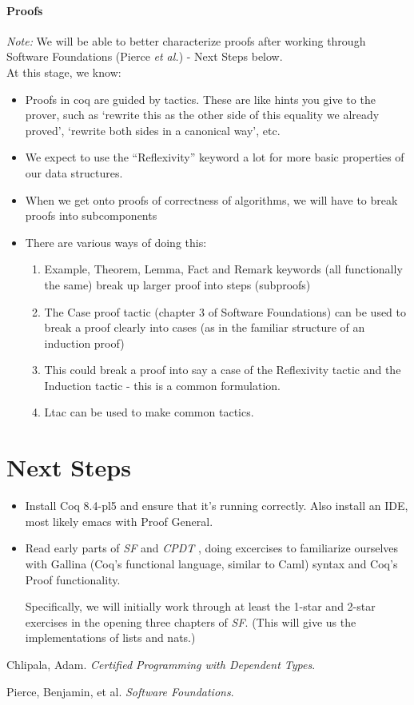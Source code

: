 \documentclass{article}
\begin{document}
\paragraph{Proofs}  %
\emph{Note:} We will be able to better characterize proofs after
working through Software Foundations (Pierce \emph{et al.}) - Next
Steps below.\\
At this stage, we know:
\begin{itemize}
\item Proofs in coq are guided by tactics. These are like hints you
  give to the prover, such as ‘rewrite this as the other side of this
  equality we already proved’, ‘rewrite both sides in a canonical
  way’,  etc.
\item We expect to use the ``Reflexivity'' keyword a lot for more
  basic properties of our data structures.
\item When we get onto proofs of correctness of algorithms, we will
  have to break proofs into subcomponents
\item There are various ways of doing this:
\begin{enumerate}
\item Example, Theorem, Lemma, Fact and Remark keywords (all
  functionally the same) break up larger proof into steps (subproofs)
\item The Case proof tactic (chapter 3 of Software Foundations) can be
  used to break a proof clearly into cases (as in the familiar
  structure of an induction proof)
\item This could break a proof into say a case of the Reflexivity
  tactic and the Induction tactic - this is a common formulation.
\item Ltac can be used to make common tactics.
\end{enumerate}

\end{itemize}

\section{Next Steps}
\begin{itemize}
  \item
    Install Coq 8.4-pl5 and ensure that it's running correctly.
    Also install an IDE, most likely emacs with Proof General.
  \item
    Read early parts of \emph{SF} \cite{sf} and \emph{CPDT} \cite{cpdt},
    doing excercises to familiarize ourselves with Gallina (Coq's functional
    language, similar to Caml) syntax and Coq's Proof functionality.

    Specifically, we will initially work through at least the 1-star and
    2-star exercises in the opening three chapters of \emph{SF}.
    (This will give us the implementations of lists and nats.)
\end{itemize}

\begin{thebibliography}{xx}
    Chlipala, Adam. \emph{Certified Programming with Dependent Types}.

    Pierce, Benjamin, et al. \emph{Software Foundations}.
\end{thebibliography}
\end{document}
